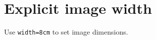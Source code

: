 \documentclass{article}
\begin{document}
\section*{Explicit image width}

Use \texttt{width=8cm} to set image dimensions.

\lipsum[1-8]
\end{document}
